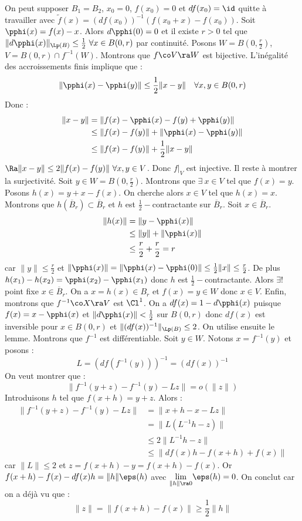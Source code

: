 \prvv
On peut supposer $B_1=B_2$, $x_0=0$, $f(x_0)=0$ et $df(x_0)=\id$ quitte à travailler avec $\tilde f(x)=(df(x_0))^{-1}(f(x_0+x)-f(x_0))$. Soit $\pphi(x)=f(x)-x$. Alors $d\pphi(0)=0$ et il existe $r>0$ tel que $\|d\pphi(x)\|_{\Lp(B)}\le\frac 1 2\ \forall x\in B(0,r)$ par continuité. 
\dl Posons $W=B\left(0,\frac r 2\right)$, $V=B(0,r)\cap f^{-1}(W)$. Montrons que $f\co V\ra W$ est bijective. L'inégalité des accroissements finis implique que :
$$\|\pphi(x)-\pphi(y)\|\le\frac 1 2\|x-y\|\quad\forall x,y\in B(0,r)$$
Donc : 
\begin{align*}
  \|x-y\|&=\|f(x)-\pphi(x)-f(y)+\pphi(y)\|\\
  &\le \|f(x)-f(y)\|+\|\pphi(x)-\pphi(y)\|\\
  &\le \|f(x)-f(y)\|+\frac 1 2\|x-y\|
\end{align*}
$\Ra \|x-y\|\le 2\|f(x)-f(y)\|\ \forall x,y\in V$.
\dl Donc $f|_V$ est injective. Il reste à montrer la surjectivité. Soit $y\in W=B(0,\frac r 2)$. Montrons que $\exists\ x\in V$ tel que $f(x)=y$. Posons $h(x)=y+x-f(x)$. On cherche alors $x\in V$ tel que $h(x)=x$.
\dd Montrons que $h(\overline{B}_r)\subset\overline{B}_r$ et $h$ est $\frac 1 2 -$contractante sur $\overline{B}_r$. Soit $x\in\overline{B}_r$.
\begin{align*}
  \|h(x)\|&=\|y-\pphi(x)\|\\
  &\le\|y\|+\|\pphi(x)\|\\
  &\le\frac r 2 +\frac r 2 =r
\end{align*}
car $\|y\|\le\frac r 2$ et $\|\pphi(x)\|=\|\pphi(x)-\pphi(0)\|\le\frac 1 2\|x\|\le\frac r 2$.
\dl De plus $h(x_1)-h(x_2)=\pphi(x_2)-\pphi(x_1)$ donc $h$ est $\frac 1 2-$contractante. Alors $\exists!$ point fixe $x\in\overline{B}_r$. On a $x=h(x)\in B_r$ et $f(x)=y\in W$ donc $x\in V$.
\dd Enfin, montrons que $f^{-1}\co X\ra V$ est $\Cl^1$. On a $df(x)=1-d\pphi(x)$ puisque $f(x)=x-\pphi(x)$ et $\|d\pphi(x)\|<\frac 1 2$ sur $B(0,r)$ donc $df(x)$ est inversible pour $x\in B(0,r)$ et $\|(df(x))^{-1}\|_{\Lp(B)}\le 2$. On utilise ensuite le lemme.
\dl Montrons que $f^{-1}$ est différentiable. Soit $y\in W$. Notons $x=f^{-1}(y)$ et posons :
$$L=\left(df(f^{-1}(y))\right)^{-1}=(df(x))^{-1}$$
On veut montrer que :
$$\|f^{-1}(y+z)-f^{-1}(y)-Lz\|=o(\|z\|)$$
Introduisons $h$ tel que $f(x+h)=y+z$. Alors :
\begin{align*}
  \|f^{-1}(y+z)-f^{-1}(y)-Lz\|&=\|x+h-x-Lz\|\\
  &=\|L(L^{-1}h-z)\|\\
  &\le 2\|L^{-1}h-z\|\\
  &\le\|df(x)h-f(x+h)+f(x)\|
\end{align*}
car $\|L\|\le 2$ et $z=f(x+h)-y=f(x+h)-f(x)$.
\dl Or $f(x+h)-f(x)-df(x)h=\|h\|\eps(h)$ avec $\underset{\|h\|\ra 0}{\lim} \eps(h)=0$. On conclut car on a déjà vu que :
$$\|z\|=\|f(x+h)-f(x)\|\ge\frac 1 2\|h\|$$
\prvf

